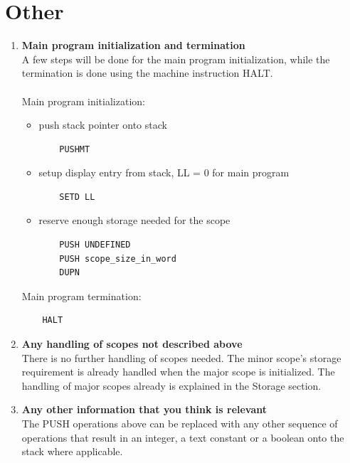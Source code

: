 \documentclass[11pt]{article}
\begin{document}
\section*{Other}
\begin{enumerate}[label=(\alph*)]
\item \textbf{Main program initialization and termination}\\
A few steps will be done for the main program initialization,
while the termination is done using the machine instruction HALT.\\
\\
Main program initialization:
\begin{itemize}
\item push stack pointer onto stack
\begin{lstlisting}
    PUSHMT 
\end{lstlisting}
\item setup display entry from stack, LL = 0 for main program
\begin{lstlisting}
    SETD LL
\end{lstlisting}
\item reserve enough storage needed for the scope
\begin{lstlisting}
    PUSH UNDEFINED
    PUSH scope_size_in_word
    DUPN
\end{lstlisting}
\end{itemize}
Main program termination:
\begin{lstlisting}
    HALT
\end{lstlisting}

\item \textbf{Any handling of scopes not described above}\\
There is no further handling of scopes needed. The minor scope's
storage requirement is already handled when the major scope is
initialized. The handling of major scopes already is explained in the Storage section.

\item \textbf{Any other information that you think is relevant}\\
The PUSH operations above can be replaced with any other sequence of
operations that result in an integer, a text constant or a boolean
onto the stack where applicable.
\end{enumerate}
\end{document}
